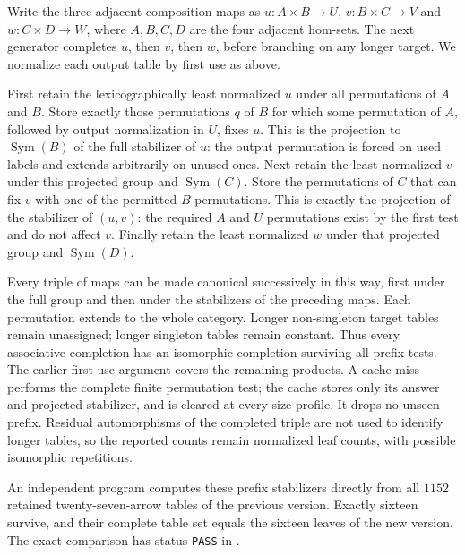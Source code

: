 \begin{remark*}
Write the three adjacent composition maps as
$u:A\times B\to U$, $v:B\times C\to V$ and $w:C\times D\to W$,
where $A,B,C,D$ are the four adjacent hom-sets.
The next generator completes $u$, then $v$, then $w$, before
branching on any longer target. We normalize each output table
by first use as above.

First retain the lexicographically least normalized $u$ under
all permutations of $A$ and $B$. Store exactly those permutations
$q$ of $B$ for which some permutation of $A$, followed by output
normalization in $U$, fixes $u$. This is the projection to
$\operatorname{Sym}(B)$ of the full stabilizer of $u$: the output
permutation is forced on used labels and extends arbitrarily on
unused ones. Next retain the least normalized $v$ under this
projected group and $\operatorname{Sym}(C)$. Store the permutations
of $C$ that can fix $v$ with one of the permitted $B$ permutations.
This is exactly the projection of the stabilizer of $(u,v)$:
the required $A$ and $U$ permutations exist by the first test and
do not affect $v$. Finally retain the least normalized $w$ under
that projected group and $\operatorname{Sym}(D)$.

Every triple of maps can be made canonical successively in this
way, first under the full group and then under the stabilizers
of the preceding maps. Each permutation extends to the whole
category. Longer non-singleton target tables remain unassigned;
longer singleton tables remain constant. Thus every associative
completion has an isomorphic completion surviving all prefix
tests. The earlier first-use argument covers the remaining
products. A cache miss performs the complete finite permutation
test; the cache stores only its answer and projected stabilizer,
and is cleared at every size profile. It drops no unseen prefix.
Residual automorphisms of the completed triple are not used to
identify longer tables, so the reported counts remain normalized
leaf counts, with possible isomorphic repetitions.

An independent program computes these prefix stabilizers directly
from all $1152$ retained twenty-seven-arrow tables of the previous
version. Exactly sixteen survive, and their complete table set
equals the sixteen leaves of the new version. The exact comparison
has status \texttt{PASS} in
.
\end{remark*}

